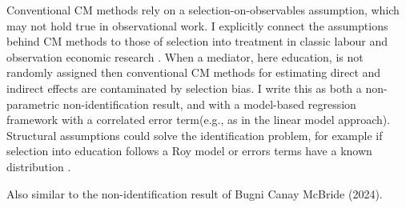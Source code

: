 Conventional CM methods rely on a selection-on-observables assumption, which may not hold true in observational work.
I explicitly connect the assumptions behind CM methods to those of selection into treatment in classic labour and observation economic research \citep{heckman2005structural}.
When a mediator, here education, is not randomly assigned then conventional CM methods for estimating direct and indirect effects are contaminated by selection bias.
I write this as both a non-parametric non-identification result, and with a model-based regression framework with a correlated error term(e.g., as in the \citealt{imai2010identification} linear model approach).
Structural assumptions could solve the identification problem, for example if selection into education follows a Roy model or errors terms have a known distribution \citep{heckman1979sample}.


Also similar to the non-identification result of Bugni Canay McBride (2024).
